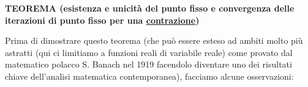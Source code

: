 \documentclass[12pt]{article}
\begin{document}
\bigskip
\textbf{TEOREMA (esistenza e unicità del punto fisso e convergenza delle iterazioni di punto fisso per una \underline{contrazione})}
\begin{center}
\end{center}
Prima di dimostrare questo teorema (che può essere esteso ad ambiti molto più astratti (qui ci limitiamo a funzioni reali di variabile reale) come provato dal matematico polacco S. Banach nel 1919 facendolo diventare uno dei risultati chiave dell'analisi matematica contemporanea), facciamo alcune osservazioni:
\end{document}
